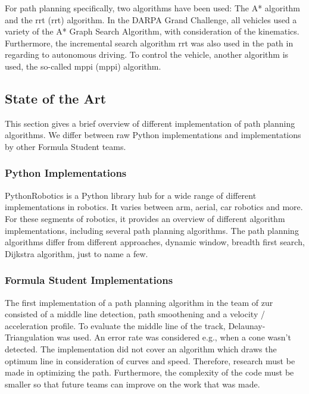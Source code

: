 For path planning specifically, two algorithms have been used: The A* algorithm and the \acrlong{rrt} (\acrshort{rrt}) algorithm. In the DARPA Grand Challenge, all vehicles used a variety of the A* Graph Search Algorithm, with consideration of the kinematics. Furthermore, the incremental search algorithm \acrshort{rrt} was also used in the path in regarding to autonomous driving.
To control the vehicle, another algorithm is used, the so-called \acrlong{mppi} (\acrshort{mppi}) algorithm.
\cite{path_planning_and_control_georgiev}

\subsection{State of the Art} \label{sec:State of the Art}
This section gives a brief overview of different implementation of path planning algorithms. We differ between raw Python implementations and implementations by other Formula Student teams.

\subsubsection{Python Implementations} \label{sec:Python Implementations}
PythonRobotics is a Python library hub for a wide range of different implementations in robotics. It varies between arm, aerial, car robotics and more.
For these segments of robotics, it provides an overview of different algorithm implementations, including several path planning algorithms.
The path planning algorithms differ from different approaches, dynamic window, breadth first search, Dijkstra algorithm, just to name a few. 
\cite{python_robotics}

\subsubsection{Formula Student Implementations} \label{sec:Formula Student Implementations}
The first implementation of a path planning algorithm in the team of \acrlong{zur} consisted of a middle line detection, path smoothening and a velocity / acceleration profile. To evaluate the middle line of the track, Delaunay-Triangulation was used. An error rate was considered e.g., when a cone wasn't detected. The implementation did not cover an algorithm which draws the optimum line in consideration of curves and speed. Therefore, research must be made in optimizing the path. Furthermore, the complexity of the code must be smaller so that future teams can improve on the work that was made.
\cite{autopilot_for_formula_student_jerome}

